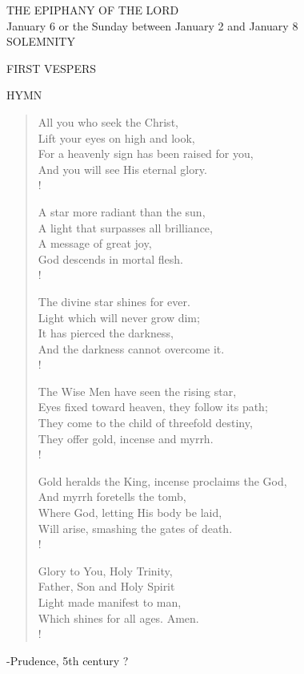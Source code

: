\begin{center}\normalsize THE EPIPHANY OF THE LORD\\
\footnotesize January 6 or the Sunday between January 2 and January 8\\
\footnotesize SOLEMNITY\\
\end{center}

\begin{flushleft}\normalsize FIRST VESPERS\\\end{flushleft}

\noindent\small{\uppercase{Hymn}}\normalsize
\begin{verse}
All you who seek the Christ,\\
Lift your eyes on high and look,\\
For a heavenly sign has been raised for you,\\
And you will see His eternal glory.\\!

A star more radiant than the sun,\\
A light that surpasses all brilliance,\\
A message of great joy,\\
God descends in mortal flesh.\\!

The divine star shines for ever.\\
Light which will never grow dim;\\
It has pierced the darkness,\\
And the darkness cannot overcome it.\\!

The Wise Men have seen the rising star,\\
Eyes fixed toward heaven, they follow its path;\\
They come to the child of threefold destiny,\\
They offer gold, incense and myrrh.\\!

Gold heralds the King, incense proclaims the God,\\
And myrrh foretells the tomb,\\
Where God, letting His body be laid,\\
Will arise, smashing the gates of death.\\!

Glory to You, Holy Trinity,\\
Father, Son and Holy Spirit\\
Light made manifest to man,\\
Which shines for all ages. Amen.\\!
\end{verse}
-Prudence, 5th century ?

